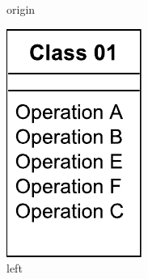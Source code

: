 \documentclass{llncs}
\begin{document}
\begin{minipage}[t]{0.59\linewidth}
\begin{figure}[H]
\begin{subfigure}[t]{0.2\linewidth}
    \caption{origin}
    \label{fig:origin}
\end{subfigure}
\hfill
\begin{subfigure}[t]{0.2\linewidth}
    \centering
    \includegraphics[width=\linewidth]{images/LeftClassDiagram}
    \caption{left}
    \label{fig:left}
\end{subfigure}
\hfill
\begin{subfigure}[t]{0.2\linewidth}
    \centering

\end{subfigure}
\end{figure}
\end{minipage}
\end{document}
